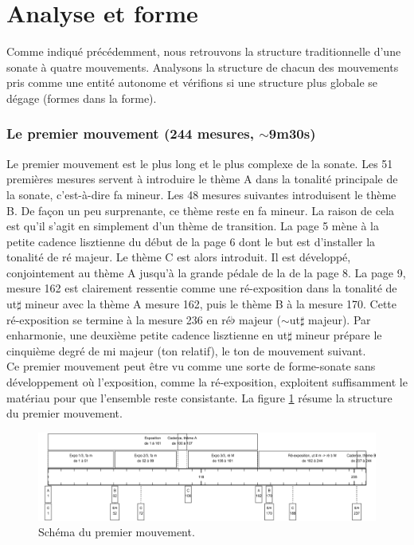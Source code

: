 \section{Analyse et forme}

Comme indiqué précédemment, nous retrouvons la structure traditionnelle d'une sonate à quatre mouvements. Analysons la structure de chacun des mouvements pris comme une entité autonome et vérifions si une structure plus globale se dégage (formes dans la forme).

\subsubsection*{Le premier mouvement (244 mesures, $\sim$9m30s)}

Le premier mouvement est le plus long et le plus complexe de la sonate. Les 51 premières mesures servent à introduire le thème A dans la tonalité principale de la sonate, c'est-à-dire fa mineur. Les 48 mesures suivantes introduisent le thème B. De façon un peu surprenante, ce thème reste en fa mineur. La raison de cela est qu'il s'agit en simplement d'un thème de transition. La page 5 mène à la petite cadence lisztienne du début de la page 6 dont le but est d'installer la tonalité de ré majeur. Le thème C est alors introduit. Il est développé, conjointement au thème A jusqu'à la grande pédale de la de la page 8. La page 9, mesure 162 est clairement ressentie comme une ré-exposition dans la tonalité de ut$\sharp$ mineur avec la thème A mesure 162, puis le thème B à la mesure 170. Cette ré-exposition se termine à la mesure 236 en ré$\flat$ majeur ($\sim$ut$\sharp$ majeur). Par enharmonie, une deuxième petite cadence lisztienne en ut$\sharp$ mineur prépare le cinquième degré de mi majeur (ton relatif), le ton de mouvement suivant.\\

Ce premier mouvement peut être vu comme une sorte de forme-sonate sans développement où l'exposition, comme la ré-exposition, exploitent suffisamment le matériau pour que l'ensemble reste consistante. La figure \ref{schema-1} résume la structure du premier mouvement.

\begin{figure}[!ht]
  \begin{bigcenter}
    \includegraphics[width=17.5cm, keepaspectratio]{frise-mvt1.png}
  \end{bigcenter}
  \caption{\label{schema-1}Schéma du premier mouvement.}
\end{figure}

